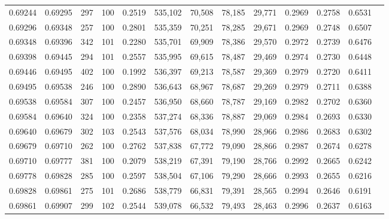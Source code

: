 \begin{tabular}{rrrrrrrrrrrrr}
0.69244 & 0.69295 &   297 & 100 &                                     0.2519 & 535,102 &  70,508 &  78,185 &  29,771 & 0.2969 & 0.2758 & 0.6531 \\
0.69296 & 0.69348 &   257 & 100 &                                     0.2801 & 535,359 &  70,251 &  78,285 &  29,671 & 0.2969 & 0.2748 & 0.6507 \\
0.69348 & 0.69396 &   342 & 101 &                                     0.2280 & 535,701 &  69,909 &  78,386 &  29,570 & 0.2972 & 0.2739 & 0.6476 \\
0.69398 & 0.69445 &   294 & 101 &                                     0.2557 & 535,995 &  69,615 &  78,487 &  29,469 & 0.2974 & 0.2730 & 0.6448 \\
0.69446 & 0.69495 &   402 & 100 &                                     0.1992 & 536,397 &  69,213 &  78,587 &  29,369 & 0.2979 & 0.2720 & 0.6411 \\
0.69495 & 0.69538 &   246 & 100 &                                     0.2890 & 536,643 &  68,967 &  78,687 &  29,269 & 0.2979 & 0.2711 & 0.6388 \\
0.69538 & 0.69584 &   307 & 100 &                                     0.2457 & 536,950 &  68,660 &  78,787 &  29,169 & 0.2982 & 0.2702 & 0.6360 \\
0.69584 & 0.69640 &   324 & 100 &                                     0.2358 & 537,274 &  68,336 &  78,887 &  29,069 & 0.2984 & 0.2693 & 0.6330 \\
0.69640 & 0.69679 &   302 & 103 &                                     0.2543 & 537,576 &  68,034 &  78,990 &  28,966 & 0.2986 & 0.2683 & 0.6302 \\
0.69679 & 0.69710 &   262 & 100 &                                     0.2762 & 537,838 &  67,772 &  79,090 &  28,866 & 0.2987 & 0.2674 & 0.6278 \\
0.69710 & 0.69777 &   381 & 100 &                                     0.2079 & 538,219 &  67,391 &  79,190 &  28,766 & 0.2992 & 0.2665 & 0.6242 \\
0.69778 & 0.69828 &   285 & 100 &                                     0.2597 & 538,504 &  67,106 &  79,290 &  28,666 & 0.2993 & 0.2655 & 0.6216 \\
0.69828 & 0.69861 &   275 & 101 &                                     0.2686 & 538,779 &  66,831 &  79,391 &  28,565 & 0.2994 & 0.2646 & 0.6191 \\
0.69861 & 0.69907 &   299 & 102 &                                     0.2544 & 539,078 &  66,532 &  79,493 &  28,463 & 0.2996 & 0.2637 & 0.6163 \\

\end{tabular}
